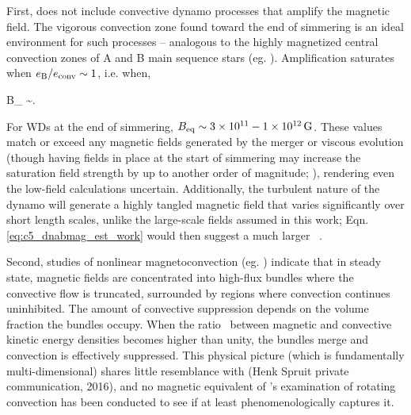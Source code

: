 
First, \citeal{stev79} does not include convective dynamo processes that amplify the magnetic field.  The vigorous convection zone found toward the end of simmering is an ideal environment for such processes -- analogous to the highly magnetized central convection zones of A and B main sequence stars (eg. \citealt{brunbt05, feat+09, augubt16}).  Amplification saturates when $\EBEconv \sim 1$, i.e. when, 

\eqbegin
B_ \sim \vconv\sqrt{8\pi\rho}.
\eqend

\noindent For WDs at the end of simmering, $B_\mathrm{eq} \sim 3\times10^{11}-1\times10^{12}\,\mathrm{G}$.  These values match or exceed any magnetic fields generated by the merger or viscous evolution (though having fields in place at the start of simmering may increase the saturation field strength by up to another order of magnitude; \citealt{feat+09}), rendering even the low-field calculations uncertain.  Additionally, the turbulent nature of the dynamo will generate a highly tangled magnetic field that varies significantly over short length scales, unlike the large-scale fields assumed in this work; Eqn. \ref{eq:c5_dnabmag_est_work} would then suggest a much larger \dnabmag\ \citep{chabgb07}.

Second, studies of nonlinear magnetoconvection (eg. \citealt{procw82}) indicate that in steady state, magnetic fields are concentrated into high-flux bundles where the convective flow is truncated, surrounded by regions where convection continues uninhibited.  The amount of convective suppression depends on the volume fraction the bundles occupy.  When the ratio \EBEconv\ between magnetic and convective kinetic energy densities becomes higher than unity, the bundles merge and convection is effectively suppressed.  This physical picture (which is fundamentally multi-dimensional) shares little resemblance with \citeal{stev79} (Henk Spruit private communication, 2016), and no magnetic equivalent of \cite{barkdl14}'s examination of rotating convection has been conducted to see if \citeal{stev79} at least phenomenologically captures it.



